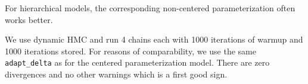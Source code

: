 \documentclass[american,]{article}
\begin{document}
For hierarchical models, the corresponding non-centered
parameterization often works better.





We use dynamic HMC and run 4 chains each with 1000 iterations of
warmup and 1000 iterations stored. For reasons of comparability, we
use the same \texttt{adapt\_delta} as for the centered
parameterization model. There are zero divergences and no other
warnings which is a first good sign.


\end{document}

